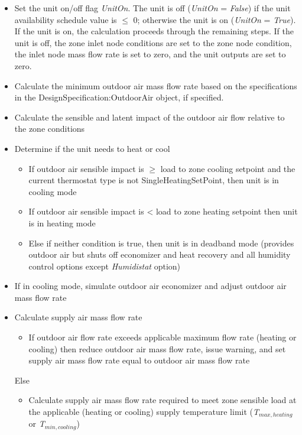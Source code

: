\begin{itemize}
  \item Set the unit on/off flag \emph{UnitOn}. The unit is off (\emph{UnitOn} = \emph{False}) if the unit availability schedule value is \(\leq\) 0; otherwise the unit is on (\emph{UnitOn} = \emph{True}). If the unit is on, the calculation proceeds through the remaining steps. If the unit is off, the zone inlet node conditions are set to the zone node condition, the inlet node mass flow rate is set to zero, and the unit outputs are set to zero.
  \item Calculate the minimum outdoor air mass flow rate based on the specifications in the DesignSpecification:OutdoorAir object, if specified.
  \item Calculate the sensible and latent impact of the outdoor air flow relative to the zone conditions
  \item Determine if the unit needs to heat or cool
    \begin{itemize}
      \item If outdoor air sensible impact is \(\geq\) load to zone cooling setpoint and the current thermostat type is not SingleHeatingSetPoint, then unit is in cooling mode
      \item If outdoor air sensible impact is \textless{} load to zone heating setpoint then unit is in heating mode
      \item Else if neither condition is true, then unit is in deadband mode (provides outdoor air but shuts off economizer and heat recovery and all humidity control options except \emph{Humidistat} option)
    \end{itemize}
  \item If in cooling mode, simulate outdoor air economizer and adjust outdoor air mass flow rate
  \item Calculate supply air mass flow rate

    \begin{itemize}
      \item If outdoor air flow rate exceeds applicable maximum flow rate (heating or cooling) then reduce outdoor air mass flow rate, issue warning, and set supply air mass flow rate equal to outdoor air mass flow rate
    \end{itemize}

    Else

    \begin{itemize}
      \item Calculate supply air mass flow rate required to meet zone sensible load at the applicable (heating or cooling) supply temperature limit (\emph{T\(_{max,heating}\)} or \emph{T\(_{min,cooling}\)})


\end{itemize}
\end{itemize}
